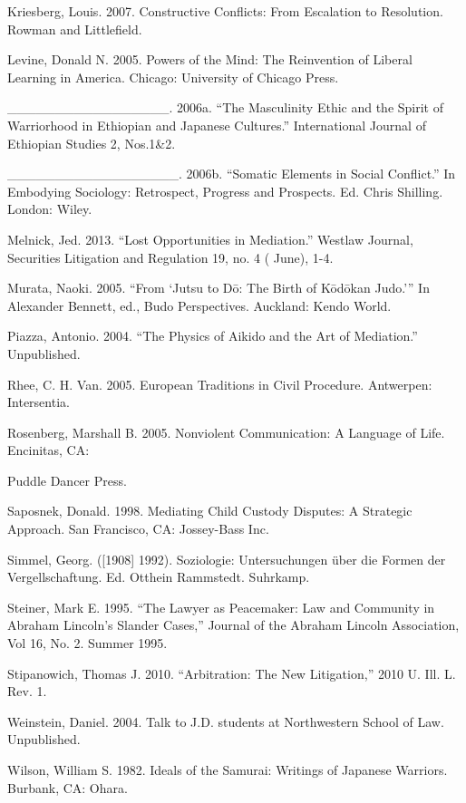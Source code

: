 \begin{list}{}{}
\item Kriesberg, Louis. 2007. Constructive Conflicts: From Escalation to Resolution. Rowman and Littlefield. 
\item Levine, Donald N. 2005. Powers of the Mind: The Reinvention of Liberal Learning in America. Chicago: University of Chicago Press.
\item  \_\_\_\_\_\_\_\_\_\_\_\_\_\_\_\_\_. 2006a. ``The Masculinity Ethic and the Spirit of Warriorhood in Ethiopian and Japanese Cultures.'' International Journal of Ethiopian Studies 2, Nos.1\&2.
\item \_\_\_\_\_\_\_\_\_\_\_\_\_\_\_\_\_\_. 2006b. ``Somatic Elements in Social Conflict.'' In Embodying Sociology: Retrospect, Progress and Prospects. Ed. Chris Shilling. London: Wiley. 
\item Melnick, Jed. 2013. ``Lost Opportunities in Mediation.'' Westlaw Journal, Securities Litigation and Regulation 19, no. 4 ( June), 1-4.
\item  Murata, Naoki. 2005. ``From `Jutsu to D\={o}: The Birth of K\={o}d\={o}kan Judo.''' In Alexander Bennett, ed., Budo Perspectives. Auckland: Kendo World.
\item Piazza, Antonio. 2004. ``The Physics of Aikido and the Art of Mediation.'' Unpublished.
\item Rhee, C. H. Van. 2005. European Traditions in Civil Procedure. Antwerpen: Intersentia.
\item Rosenberg, Marshall B. 2005. Nonviolent Communication: A Language of Life. Encinitas, CA: 
\item Puddle Dancer Press.
\item Saposnek, Donald. 1998. Mediating Child Custody Disputes: A Strategic Approach. San Francisco, CA: Jossey-Bass Inc. 
\item Simmel, Georg. ([1908] 1992). Soziologie: Untersuchungen \"{u}ber die Formen der Vergellschaftung. Ed. Otthein Rammstedt. Suhrkamp.
\item Steiner, Mark E. 1995. ``The Lawyer as Peacemaker: Law and Community in Abraham Lincoln's Slander Cases,'' Journal of the Abraham Lincoln Association, Vol 16, No. 2. Summer 1995.
\item Stipanowich, Thomas J. 2010. ``Arbitration: The New Litigation,'' 2010 U. Ill. L. Rev. 1.
\item Weinstein, Daniel. 2004. Talk to J.D. students at Northwestern School of Law. Unpublished.
\item Wilson, William S. 1982. Ideals of the Samurai: Writings of Japanese Warriors. Burbank, CA: Ohara. 
\end{list}
